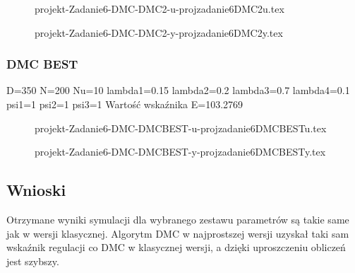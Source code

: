 \ifdefined\CompileFigures
    \begin{figure}[H] 
            \centering
            
            \caption{projekt-Zadanie6-DMC-DMC2-u-projzadanie6DMC2u.tex}
            \label{projekt:zad6:figure:projzadanie6DMC2u}
    \end{figure}
\fi


\ifdefined\CompileFigures
    \begin{figure}[H] 
            \centering
            
            \caption{projekt-Zadanie6-DMC-DMC2-y-projzadanie6DMC2y.tex}
            \label{projekt:zad6:figure:projzadanie6DMC2y}
    \end{figure}
\fi

\subsubsection{DMC BEST}
D=350 N=200 Nu=10 
lambda1=0.15 lambda2=0.2 lambda3=0.7 lambda4=0.1 
psi1=1 psi2=1 psi3=1 
Wartość wskaźnika E=103.2769


\ifdefined\CompileFigures
    \begin{figure}[H] 
            \centering
            
            \caption{projekt-Zadanie6-DMC-DMCBEST-u-projzadanie6DMCBESTu.tex}
            \label{projekt:zad6:figure:projzadanie6DMCBESTu}
    \end{figure}
\fi


\ifdefined\CompileFigures
    \begin{figure}[H] 
            \centering
            
            \caption{projekt-Zadanie6-DMC-DMCBEST-y-projzadanie6DMCBESTy.tex}
            \label{projekt:zad6:figure:projzadanie6DMCBESTy}
    \end{figure}
\fi

\subsection{Wnioski}

Otrzymane wyniki symulacji dla wybranego zestawu parametrów są takie same jak w
wersji klasycznej.
\newline
Algorytm DMC w najprostszej wersji uzyskał taki sam wskaźnik regulacji co
DMC w klasycznej wersji, a dzięki uproszczeniu obliczeń jest szybszy.


\newpage

